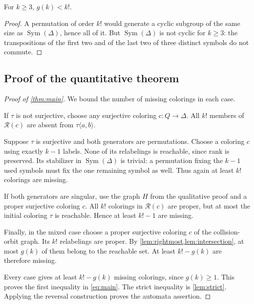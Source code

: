 \documentclass[11pt,a4paper]{article}
\numberwithin{equation}{section}
\theoremstyle{definition}
\theoremstyle{remark}
\newcommand{\D}{\Delta}
\newcommand{\Sym}{\operatorname{Sym}}
\begin{document}
\begin{lemma}\label{lem:strict}
For $k\ge3$, $g(k)<k!$.
\end{lemma}
\begin{proof}
A permutation of order $k!$ would generate a cyclic subgroup of the same
size as $\Sym(\D)$, hence all of it. But $\Sym(\D)$ is not cyclic for
$k\ge3$: the transpositions of the first two and of the last two of three
distinct symbols do not commute.
\end{proof}

\subsection{Proof of the quantitative theorem}

\begin{proof}[Proof of \cref{thm:main}]
We bound the number of missing colorings in each case.

If $\tau$ is not surjective, choose any surjective coloring $c:Q\to\D$.
All $k!$ members of $\mathcal R(c)$ are absent from $\tau\langle a,b\rangle$.

Suppose $\tau$ is surjective and both generators are permutations. Choose a
coloring $c$ using exactly $k-1$ labels. None of its relabelings is reachable,
since rank is preserved. Its stabilizer in $\Sym(\D)$ is trivial: a
permutation fixing the $k-1$ used symbols must fix the one remaining symbol
as well. Thus again at least $k!$ colorings are missing.

If both generators are singular, use the graph $H$ from the qualitative
proof and a proper surjective coloring $c$. All $k!$ colorings in
$\mathcal R(c)$ are proper, but at most the initial coloring $\tau$ is
reachable. Hence at least $k!-1$ are missing.

Finally, in the mixed case choose a proper surjective coloring $c$ of the
collision-orbit graph. Its $k!$ relabelings are proper. By
\cref{lem:rightmost,lem:intersection}, at most $g(k)$ of them belong to the
reachable set. At least $k!-g(k)$ are therefore missing.

Every case gives at least $k!-g(k)$ missing colorings, since $g(k)\ge1$.
This proves the first inequality in \eqref{eq:main}. The strict inequality
is \cref{lem:strict}. Applying the reversal construction proves the automata
assertion.
\end{proof}
\end{document}
